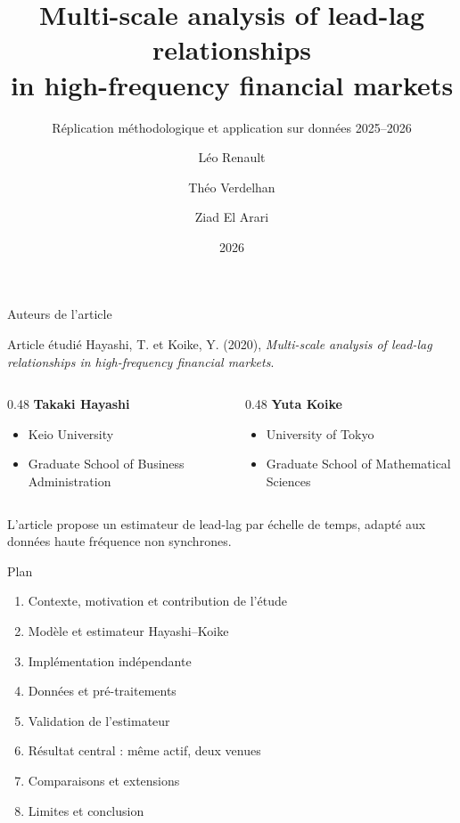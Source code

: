 \documentclass[10pt,aspectratio=169]{beamer}
\title[Hayashi--Koike lead-lag HF]{Multi-scale analysis of lead-lag relationships\\in high-frequency financial markets}
\subtitle{Réplication méthodologique et application sur données 2025--2026}
\author[Renault \; Verdelhan \; El Arari]{Léo Renault \and Théo Verdelhan \and Ziad El Arari}
\institute[Paris-Dauphine PSL]{Master 2 -- Ingénierie Économique et Financière\\Parcours Finance Quantitative\\Université Paris-Dauphine -- PSL}
\date{2026}
\begin{document}
\begin{frame}
  \titlepage
\end{frame}

\begin{frame}{Auteurs de l'article}
  \begin{block}{Article étudié}
    Hayashi, T. et Koike, Y. (2020), \emph{Multi-scale analysis of lead-lag relationships in high-frequency financial markets}.
  \end{block}

  \vspace{0.35cm}
  \begin{columns}[T]
    \begin{column}{0.48\linewidth}
      \textbf{Takaki Hayashi}
      \begin{itemize}
        \item Keio University
        \item Graduate School of Business Administration
      \end{itemize}
    \end{column}
    \begin{column}{0.48\linewidth}
      \textbf{Yuta Koike}
      \begin{itemize}
        \item University of Tokyo
        \item Graduate School of Mathematical Sciences
      \end{itemize}
    \end{column}
  \end{columns}

  \vspace{0.35cm}
  \small L'article propose un estimateur de lead-lag par échelle de temps, adapté aux données haute fréquence non synchrones.
\end{frame}

\begin{frame}{Plan}
  \begin{enumerate}
    \item Contexte, motivation et contribution de l'étude
    \item Modèle et estimateur Hayashi--Koike
    \item Implémentation indépendante
    \item Données et pré-traitements
    \item Validation de l'estimateur
    \item Résultat central : même actif, deux venues
    \item Comparaisons et extensions
    \item Limites et conclusion
  \end{enumerate}
\end{frame}
\end{document}
